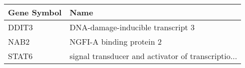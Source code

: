 \begin{tabular}{ll}
\toprule
Gene Symbol &                                               Name \\
\midrule
      DDIT3 &                  DNA-damage-inducible transcript 3 \\
       NAB2 &                           NGFI-A binding protein 2 \\
      STAT6 & signal transducer and activator of transcriptio... \\
\bottomrule
\end{tabular}

